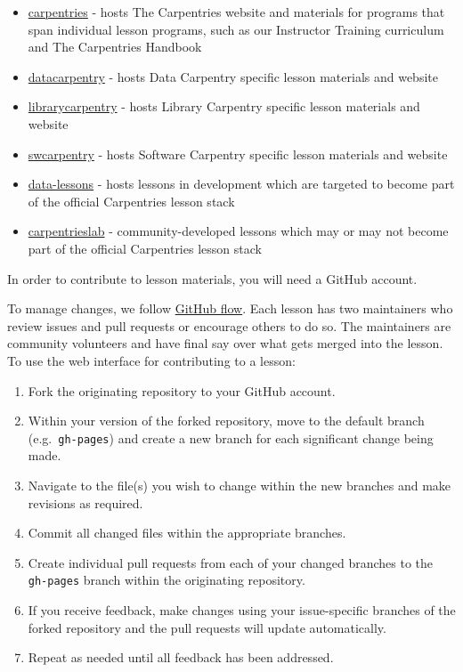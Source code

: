 \documentclass[
]{book}
\providecommand{\tightlist}{%
  \setlength{\itemsep}{0pt}\setlength{\parskip}{0pt}}
\begin{document}
\begin{itemize}
\tightlist
\item
  \href{https://github.com/carpentries}{carpentries} - hosts The Carpentries website and materials for programs that span individual lesson programs, such as our Instructor Training curriculum and The Carpentries Handbook
\item
  \href{https://github.com/datacarpentry}{datacarpentry} - hosts Data Carpentry specific lesson materials and website
\item
  \href{https://github.com/librarycarpentry}{librarycarpentry} - hosts Library Carpentry specific lesson materials and website
\item
  \href{https://github.com/swcarpentry}{swcarpentry} - hosts Software Carpentry specific lesson materials and website
\item
  \href{https://github.com/data-lessons}{data-lessons} - hosts lessons in development which are targeted to become part of the official Carpentries lesson stack
\item
  \href{http://github.com/carpentrieslab}{carpentrieslab} - community-developed lessons which may or may not become part of the official Carpentries lesson stack
\end{itemize}

In order to contribute to lesson materials, you will need a GitHub account.

To manage changes, we follow \href{https://guides.github.com/introduction/flow/}{GitHub flow}.
Each lesson has two maintainers who review issues and pull requests or encourage others to do so.
The maintainers are community volunteers and have final say over what gets merged into the lesson.
To use the web interface for contributing to a lesson:

\begin{enumerate}
\def\labelenumi{\arabic{enumi}.}
\tightlist
\item
  Fork the originating repository to your GitHub account.
\item
  Within your version of the forked repository, move to the
  default branch (e.g.~\texttt{gh-pages}) and
  create a new branch for each significant change being made.
\item
  Navigate to the file(s) you wish to change within the new branches and make revisions as required.
\item
  Commit all changed files within the appropriate branches.
\item
  Create individual pull requests from each of your changed branches
  to the \texttt{gh-pages} branch within the originating repository.
\item
  If you receive feedback, make changes using your issue-specific branches of the forked
  repository and the pull requests will update automatically.
\item
  Repeat as needed until all feedback has been addressed.
\end{enumerate}
\end{document}
